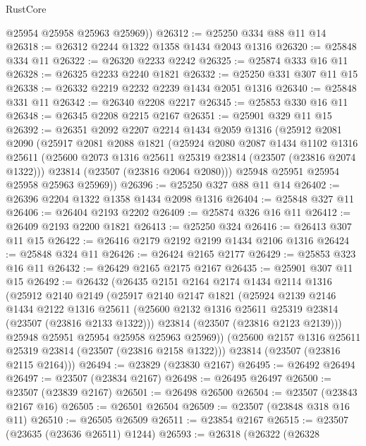 \begin{lexlean}{RustCore}
\begin{coremodule}
        @25954
        @25958
        @25963
        @25969))
@26312 := @25250 @334 @88 @11 @14
@26318 := @26312 @2244 @1322 @1358 @1434 @2043 @1316
@26320 := @25848 @334 @11
@26322 := @26320 @2233 @2242
@26325 := @25874 @333 @16 @11
@26328 := @26325 @2233 @2240 @1821
@26332 := @25250 @331 @307 @11 @15
@26338 := @26332 @2219 @2232 @2239 @1434 @2051 @1316
@26340 := @25848 @331 @11
@26342 := @26340 @2208 @2217
@26345 := @25853 @330 @16 @11
@26348 := @26345 @2208 @2215 @2167
@26351 := @25901 @329 @11 @15
@26392 := @26351
    @2092
    @2207
    @2214
    @1434
    @2059
    @1316
    (@25912
      @2081
      @2090
      (@25917
        @2081
        @2088
        @1821
        (@25924
          @2080
          @2087
          @1434
          @1102
          @1316
          @25611
          (@25600 @2073 @1316 @25611 @25319 @23814 (@23507 (@23816 @2074 @1322)))
          @23814
          (@23507 (@23816 @2064 @2080)))
        @25948
        @25951
        @25954
        @25958
        @25963
        @25969))
@26396 := @25250 @327 @88 @11 @14
@26402 := @26396 @2204 @1322 @1358 @1434 @2098 @1316
@26404 := @25848 @327 @11
@26406 := @26404 @2193 @2202
@26409 := @25874 @326 @16 @11
@26412 := @26409 @2193 @2200 @1821
@26413 := @25250 @324
@26416 := @26413 @307 @11 @15
@26422 := @26416 @2179 @2192 @2199 @1434 @2106 @1316
@26424 := @25848 @324 @11
@26426 := @26424 @2165 @2177
@26429 := @25853 @323 @16 @11
@26432 := @26429 @2165 @2175 @2167
@26435 := @25901 @307 @11 @15
@26492 := @26432
    (@26435
      @2151
      @2164
      @2174
      @1434
      @2114
      @1316
      (@25912
        @2140
        @2149
        (@25917
          @2140
          @2147
          @1821
          (@25924
            @2139
            @2146
            @1434
            @2122
            @1316
            @25611
            (@25600 @2132 @1316 @25611 @25319 @23814 (@23507 (@23816 @2133 @1322)))
            @23814
            (@23507 (@23816 @2123 @2139)))
          @25948
          @25951
          @25954
          @25958
          @25963
          @25969))
      (@25600 @2157 @1316 @25611 @25319 @23814 (@23507 (@23816 @2158 @1322)))
      @23814
      (@23507 (@23816 @2115 @2164)))
@26494 := @23829 (@23830 @2167)
@26495 := @26492 @26494
@26497 := @23507 (@23834 @2167)
@26498 := @26495 @26497
@26500 := @23507 (@23839 @2167)
@26501 := @26498 @26500
@26504 := @23507 (@23843 @2167 @16)
@26505 := @26501 @26504
@26509 := @23507 (@23848 @318 @16 @11)
@26510 := @26505 @26509
@26511 := @23854 @2167
@26515 := @23507 (@23635 (@23636 @26511) @1244)
@26593 := @26318
    (@26322
      (@26328

\end{coremodule}
\end{lexlean}
